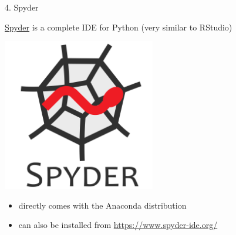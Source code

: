
\begin{vbframe}{4. Spyder}

\vfill

\href{https://www.spyder-ide.org}{Spyder} is a complete IDE for Python (very similar to RStudio)

\centering
\includegraphics[width=0.5\textwidth]{figure/spyder.png}

\begin{itemize}
	\item directly comes with the Anaconda distribution
	\item can also be installed from \url{https://www.spyder-ide.org/}
\end{itemize}

\vfill

\end{vbframe}


